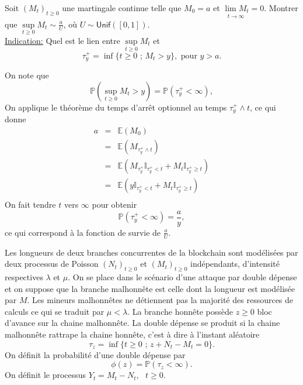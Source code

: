 \documentclass[11pts, answers]{exam}
\newcommand*{\UnifDist}{\mathsf{Unif}}
\newcommand*{\Prob}{\mathbb{P}}
\newcommand*{\E}{\mathbb{E}}
\newcommand*{\ind}{\mathbb{I}}
\begin{document}
\begin{questions}
\question Soit $(M_t)_{t\geq 0}$ une martingale continue telle que $M_0 = a$ et $\underset{t\rightarrow\infty}{\lim M_t} = 0$. Montrer que $\underset{t\geq 0}{\sup}M_t\sim \frac{a}{U}$, où $U\sim\UnifDist([0, 1])$.\\
\underline{Indication:} Quel est le lien entre $\underset{t\geq 0}{\sup}M_t$ et $$
\tau_y^+ = \inf\{t\geq 0\text{ ; }M_t>y\},\text{ pour }y>	a.
$$
\begin{solution}
On note que 
$$
\Prob(\underset{t\geq 0}{\sup}M_t >y) = \Prob(\tau_y^+ <\infty),
$$
On applique le théorème du temps d'arrêt optionnel au temps $\tau_y^+\land t$, ce qui donne
\begin{eqnarray*}
a&=&\E(M_0)\\
&=&\E(M_{\tau_y^+\land t})\\
&=&\E(M_{\tau_y^+}\ind_{\tau_y^+ < t} + M_{t}\ind_{\tau_y^+ \geq t})\\
&=&\E(y\ind_{\tau_y^+ < t} + M_{t}\ind_{\tau_y^+ \geq t})\\
\end{eqnarray*}
On fait tendre $t$ vers $\infty$ pour obtenir
$$
\Prob(\tau_y^+ < \infty) = \frac ay,
$$
ce qui correspond à la fonction de survie de $\frac aU$.
\end{solution}
\question Les longueurs de deux branches concurrentes de la blockchain sont modélisées par deux processus de Poisson $(N_t)_{t\geq 0}$ et $(M_t)_{t\geq 0}$ indépendants, d'intensité respectives $\lambda$ et $\mu$. On se place dans le scénario d'une attaque par double dépense et on suppose que la branche malhonnête est celle dont la longueur est modélisée par $M$. Les mineurs malhonnêtes ne détiennent pas la majorité des ressources de calculs ce qui se traduit par $\mu < \lambda$. La branche honnête possède $z\geq 0$ bloc d'avance sur la chaine malhonnête. La double dépense se produit si la chaine malhonnête rattrape la chaine honnête, c'est à dire à l'instant aléatoire 
$$
\tau_z = \inf\{t\geq 0\text{ ; }z + N_t - M_t = 0\}.
$$
On définit la probabilité d'une double dépense par 
$$
\phi(z) = \Prob(\tau_z <\infty).
$$
On définit le processus $Y_t = M_t - N_t,\text{ }t\geq 0$.
\begin{parts}

\end{parts}
\end{questions}
\end{document}
